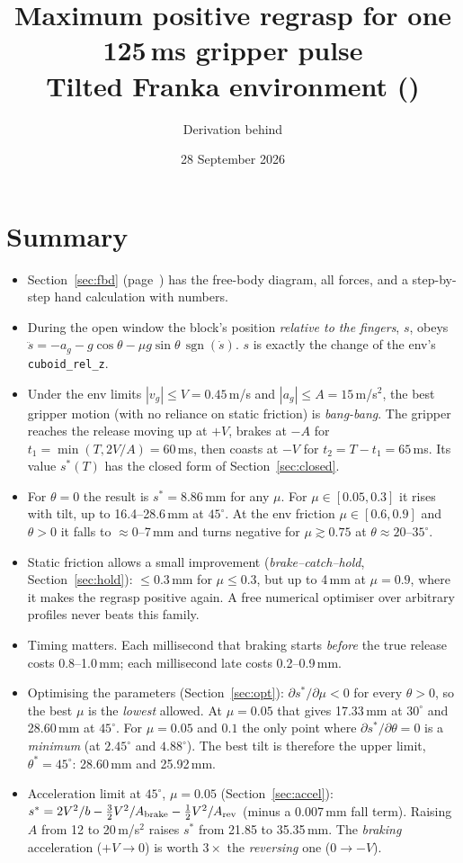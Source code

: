 \documentclass[11pt,a4paper]{article}
\title{Maximum positive regrasp for one 125\,ms gripper pulse\\[2pt]
\large Tilted Franka environment (\code{env\_franka\_parallel\_tilted.py})}
\author{Derivation behind \code{franka\_controllers/scripts/assess\_angle.py}}
\date{28 September 2026}
\newcommand{\sgn}{\operatorname{sgn}}
\newcommand{\code}[1]{\texttt{#1}}
\begin{document}
\maketitle

\section*{Summary}
\begin{itemize}
  \item Section~\ref{sec:fbd} (page~\pageref{fig:fbd}) has the free-body diagram, all forces, and a step-by-step hand
        calculation with numbers.
  \item During the open window the block's position \emph{relative to the fingers}, $s$, obeys
        $\ddot s = -a_g - g\cos\theta - \mu g\sin\theta\,\sgn(\dot s)$. $s$ is exactly the change of the
        env's \code{cuboid\_rel\_z}.
  \item Under the env limits $|v_g|\le V=0.45$\,m/s and $|a_g|\le A=15$\,m/s$^2$, the best gripper motion
        (with no reliance on static friction) is \emph{bang-bang}. The gripper reaches the release moving up at $+V$,
        brakes at $-A$ for $t_1=\min(T,2V/A)=60$\,ms, then coasts at $-V$ for $t_2=T-t_1=65$\,ms.
        Its value $s^*(T)$ has the closed form of Section~\ref{sec:closed}.
  \item For $\theta=0$ the result is $s^*=8.86$\,mm for any $\mu$. For $\mu\in[0.05,0.3]$ it rises with tilt, up to
        16.4--28.6\,mm at $45^\circ$. At the env friction $\mu\in[0.6,0.9]$ and $\theta>0$ it falls to $\approx 0$--7\,mm
        and turns negative for $\mu\gtrsim0.75$ at $\theta\approx 20$--$35^\circ$.
  \item Static friction allows a small improvement (\emph{brake--catch--hold}, Section~\ref{sec:hold}):
        $\le0.3$\,mm for $\mu\le0.3$, but up to 4\,mm at $\mu=0.9$, where it makes the regrasp positive again.
        A free numerical optimiser over arbitrary profiles never beats this family.
  \item Timing matters. Each millisecond that braking starts \emph{before} the true release costs 0.8--1.0\,mm;
        each millisecond late costs 0.2--0.9\,mm.
  \item Optimising the parameters (Section~\ref{sec:opt}): $\partial s^*/\partial\mu<0$ for every $\theta>0$, so the best
        $\mu$ is the \emph{lowest} allowed. At $\mu=0.05$ that gives 17.33\,mm at $30^\circ$ and 28.60\,mm at $45^\circ$.
        For $\mu=0.05$ and $0.1$ the only point where $\partial s^*/\partial\theta=0$ is a \emph{minimum} (at $2.45^\circ$
        and $4.88^\circ$). The best tilt is therefore the upper limit, $\theta^*=45^\circ$: 28.60\,mm and 25.92\,mm.
  \item Acceleration limit at $45^\circ$, $\mu=0.05$ (Section~\ref{sec:accel}):
        $s^*=2V^2/b-\tfrac32V^2/A_{\rm brake}-\tfrac12V^2/A_{\rm rev}$ (minus a 0.007\,mm fall term).
        Raising $A$ from 12 to 20\,m/s$^2$ raises $s^*$ from 21.85 to 35.35\,mm. The \emph{braking} acceleration
        ($+V\to0$) is worth $3\times$ the \emph{reversing} one ($0\to-V$).
\end{itemize}
\end{document}

